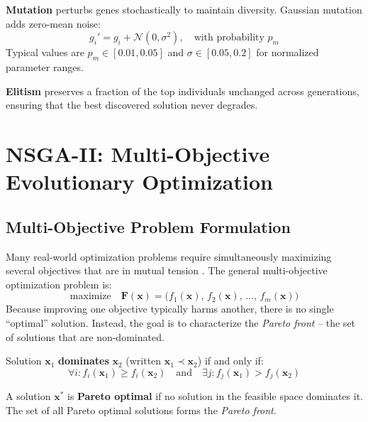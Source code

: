 \textbf{Mutation} perturbs genes stochastically to maintain diversity. Gaussian mutation adds zero-mean noise:
\begin{equation}
g_i' = g_i + \mathcal{N}(0, \sigma^2), \quad \text{with probability } p_m
\label{eq:gaussian_mutation}
\end{equation}
Typical values are $p_m \in [0.01, 0.05]$ and $\sigma \in [0.05, 0.2]$ for normalized parameter ranges.

\textbf{Elitism} preserves a fraction of the top individuals unchanged across generations, ensuring that the best discovered solution never degrades.

\section{NSGA-II: Multi-Objective Evolutionary Optimization}

\subsection{Multi-Objective Problem Formulation}

Many real-world optimization problems require simultaneously maximizing several objectives that are in mutual tension \cite{deb2002fast}. The general multi-objective optimization problem is:
\begin{equation}
\text{maximize} \quad \mathbf{F}(\mathbf{x}) = \bigl(f_1(\mathbf{x}),\, f_2(\mathbf{x}),\, \ldots,\, f_m(\mathbf{x})\bigr)
\end{equation}
Because improving one objective typically harms another, there is no single ``optimal'' solution. Instead, the goal is to characterize the \textit{Pareto front} -- the set of solutions that are non-dominated.

\begin{definition}
Solution $\mathbf{x}_1$ \textbf{dominates} $\mathbf{x}_2$ (written $\mathbf{x}_1 \prec \mathbf{x}_2$) if and only if:
\begin{equation}
\forall i : f_i(\mathbf{x}_1) \geq f_i(\mathbf{x}_2) \quad \text{and} \quad \exists j : f_j(\mathbf{x}_1) > f_j(\mathbf{x}_2)
\end{equation}
\end{definition}

\begin{definition}
A solution $\mathbf{x}^*$ is \textbf{Pareto optimal} if no solution in the feasible space dominates it. The set of all Pareto optimal solutions forms the \textit{Pareto front}.
\end{definition}


